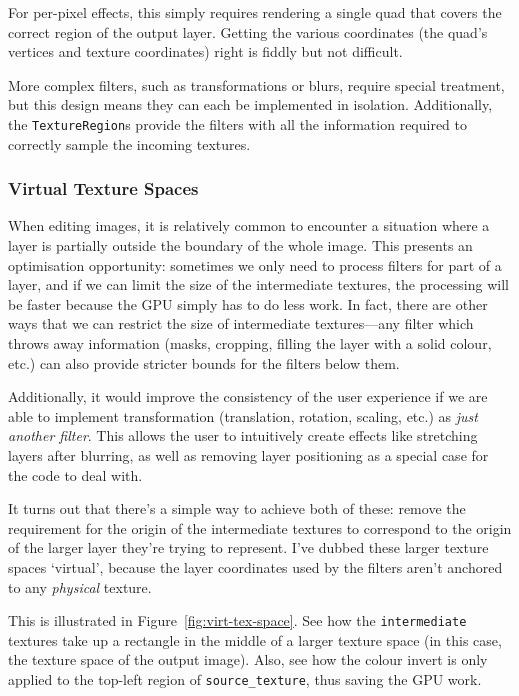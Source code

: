 \documentclass[12pt]{article}
\begin{document}
For per-pixel effects, this simply requires rendering a single quad that covers the correct region
of the output layer.  Getting the various coordinates (the quad's vertices and texture coordinates)
right is fiddly but not difficult.

More complex filters, such as transformations or blurs, require special treatment, but this design
means they can each be implemented in isolation.  Additionally, the \verb|TextureRegion|s provide
the filters with all the information required to correctly sample the incoming textures.

\subsubsection{Virtual Texture Spaces}\label{sec:virt-tex-spaces}

When editing images, it is relatively common to encounter a situation where a layer is partially
outside the boundary of the whole image.  This presents an optimisation opportunity: sometimes we
only need to process filters for part of a layer, and if we can limit the size of the intermediate
textures, the processing will be faster because the GPU simply has to do less work.  In fact, there
are other ways that we can restrict the size of intermediate textures---any filter which throws away
information (masks, cropping, filling the layer with a solid colour, etc.) can also provide stricter
bounds for the filters below them.

Additionally, it would improve the consistency of the user experience if we are able to implement
transformation (translation, rotation, scaling, etc.) as \emph{just another filter}.  This allows
the user to intuitively create effects like stretching layers after blurring, as well as removing
layer positioning as a special case for the code to deal with.

It turns out that there's a simple way to achieve both of these: remove the requirement for the
origin of the intermediate textures to correspond to the origin of the larger layer they're trying
to represent.  I've dubbed these larger texture spaces `virtual', because the layer coordinates used
by the filters aren't anchored to any \emph{physical} texture.

This is illustrated in Figure~\ref{fig:virt-tex-space}.  See how the \verb|intermediate| textures
take up a rectangle in the middle of a larger texture space (in this case, the texture space of the
output image).  Also, see how the colour invert is only applied to the top-left region of
\verb|source_texture|, thus saving the GPU work.
\end{document}
